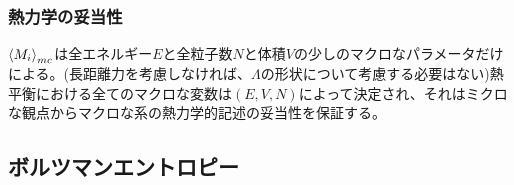 \documentclass{ltjsarticle}
\begin{document}
  \subsubsection{熱力学の妥当性}
  $\ev{M_i}_{mc}$は全エネルギー$E$と全粒子数$N$と体積$V$の少しのマクロなパラメータだけによる。(長距離力を考慮しなければ、$\Lambda$の形状について考慮する必要はない)熱平衡における全てのマクロな変数は$(E,V,N)$によって決定され、それはミクロな観点からマクロな系の熱力学的記述の妥当性を保証する。
  \subsection{ボルツマンエントロピー}

\end{document}
